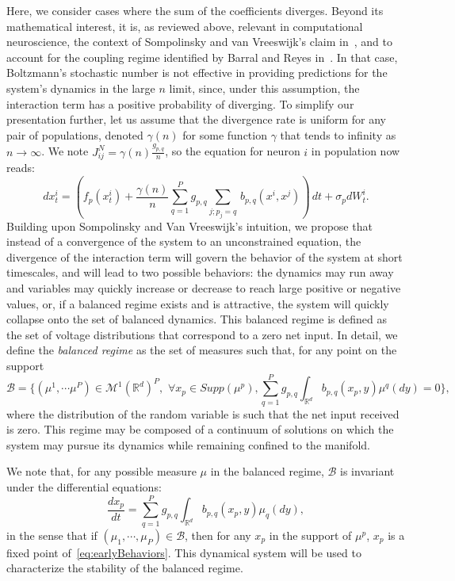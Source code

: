 \documentclass[onefignum,onetabnum]{siamart190516}
\newcommand{\R}{\mathbb{R}}
\newcommand{\1}{\mathbbm{1}}
\newcommand{\B}{\mathcal{B}}
\newcommand{\review}[1]{\textcolor{midblue}{ #1}}
\newcommand{\minor}[1]{\textcolor{orange}{ #1}}
\renewcommand{\review}[1]{{ #1}}
\renewcommand{\minor}[1]{{ #1}}
\begin{document}
\review{Here, we consider cases where the sum of the coefficients diverges. \minor{Beyond its mathematical interest, it is, as reviewed above, relevant in computational neuroscience, the context of Sompolinsky and van Vreeswijk's claim in~\cite{sompolinsky-van-vreeswijk}, and to account for the coupling regime identified by Barral and Reyes in~\cite{barral2016synaptic}.}} In that case, Boltzmann's stochastic number is not effective in providing predictions for the system's dynamics in the large $n$ limit, since, under this assumption, the interaction term has a positive probability of diverging. To simplify our presentation further, let us assume that the divergence rate is uniform for any pair of populations, denoted $\gamma(n)$ for some function $\gamma$ that tends to infinity as $n\to \infty$. We note $J_{ij}^N=\gamma(n)\frac{g_{p,q}}{n}$, so the equation for neuron $i$ in population now reads:
\begin{equation}\label{eq:gamma_network}
dx^i_t = \left(f_{p}(x^i_t)+\frac{\gamma(n)}{n} \sum_{q=1}^P  g_{p,q} \sum_{j;p_j=q} \,b_{p,q}(x^i,x^j) \right)\,dt+ \sigma_{p} dW^i_t. 
\end{equation}
Building upon Sompolinsky and Van Vreeswijk's intuition, we propose that instead of a convergence of the system to an unconstrained equation, the divergence of the interaction term will govern the behavior of the system at short timescales, and will lead to two possible behaviors: the dynamics may run away and variables may quickly increase or decrease to reach large positive or negative values, or, if a balanced regime exists and is attractive, the system will quickly collapse onto the set of balanced dynamics. This balanced regime is defined as the set of voltage distributions that correspond to a zero net input. In detail, we define the \emph{balanced regime} as the set of measures such that, for any point on the support 
\begin{equation}\label{eq:balance_manifold}
\B=\{(\mu^1,\cdots \mu^P)\in \mathcal{M}^1(\R^d)^P,\,\, \forall x_p \in Supp(\mu^p), \sum_{q=1}^P g_{p,q} \int_{\R^d} b_{p,q}(x_p,y)\mu^q({dy})=0\},
\end{equation}
 where the distribution of the random variable is such that the net input received is zero. This regime may be composed of a continuum of solutions on which the system may pursue its dynamics while remaining confined to the manifold.
 
\review{We note that, for any possible measure $\mu$ in the balanced regime, $\B$ is invariant under the differential equations:
\begin{equation}\label{eq:earlyBehaviors}
\frac{dx_p}{dt}=\sum_{q=1}^{P} g_{p,q}\int_{\R^d} b_{p,q}(x_p,y)\mu_q(\review{dy}),
\end{equation}
in the sense that if $(\mu_1,\cdots,\mu_P)\in\B$, then for any $x_p$ in the support of $\mu^p$, $x_p$ is a fixed point of~\eqref{eq:earlyBehaviors}. This dynamical system will be used to characterize the stability of the balanced regime. 
} 
\end{document}
